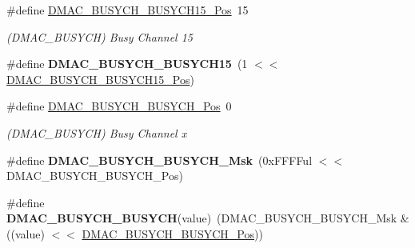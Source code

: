 \begin{DoxyCompactItemize}
\item 
\hypertarget{group___s_a_m_l21___d_m_a_c_ga32266a6c2493fd1bccb96dcc37d50d46}{}\#define \hyperlink{group___s_a_m_l21___d_m_a_c_ga32266a6c2493fd1bccb96dcc37d50d46}{D\+M\+A\+C\+\_\+\+B\+U\+S\+Y\+C\+H\+\_\+\+B\+U\+S\+Y\+C\+H15\+\_\+\+Pos}~15\label{group___s_a_m_l21___d_m_a_c_ga32266a6c2493fd1bccb96dcc37d50d46}

\begin{DoxyCompactList}\small\item\em (D\+M\+A\+C\+\_\+\+B\+U\+S\+Y\+C\+H) Busy Channel 15 \end{DoxyCompactList}\item 
\hypertarget{group___s_a_m_l21___d_m_a_c_ga7c514830398c63aab63c35eb10e139b3}{}\#define {\bfseries D\+M\+A\+C\+\_\+\+B\+U\+S\+Y\+C\+H\+\_\+\+B\+U\+S\+Y\+C\+H15}~(1 $<$$<$ \hyperlink{group___s_a_m_l21___d_m_a_c_ga32266a6c2493fd1bccb96dcc37d50d46}{D\+M\+A\+C\+\_\+\+B\+U\+S\+Y\+C\+H\+\_\+\+B\+U\+S\+Y\+C\+H15\+\_\+\+Pos})\label{group___s_a_m_l21___d_m_a_c_ga7c514830398c63aab63c35eb10e139b3}

\item 
\hypertarget{group___s_a_m_l21___d_m_a_c_gac73b04883faa8828412b8131b075f14a}{}\#define \hyperlink{group___s_a_m_l21___d_m_a_c_gac73b04883faa8828412b8131b075f14a}{D\+M\+A\+C\+\_\+\+B\+U\+S\+Y\+C\+H\+\_\+\+B\+U\+S\+Y\+C\+H\+\_\+\+Pos}~0\label{group___s_a_m_l21___d_m_a_c_gac73b04883faa8828412b8131b075f14a}

\begin{DoxyCompactList}\small\item\em (D\+M\+A\+C\+\_\+\+B\+U\+S\+Y\+C\+H) Busy Channel x \end{DoxyCompactList}\item 
\hypertarget{group___s_a_m_l21___d_m_a_c_ga37928bfcd51c69c992fe835204a67da3}{}\#define {\bfseries D\+M\+A\+C\+\_\+\+B\+U\+S\+Y\+C\+H\+\_\+\+B\+U\+S\+Y\+C\+H\+\_\+\+Msk}~(0x\+F\+F\+F\+Ful $<$$<$ D\+M\+A\+C\+\_\+\+B\+U\+S\+Y\+C\+H\+\_\+\+B\+U\+S\+Y\+C\+H\+\_\+\+Pos)\label{group___s_a_m_l21___d_m_a_c_ga37928bfcd51c69c992fe835204a67da3}

\item 
\hypertarget{group___s_a_m_l21___d_m_a_c_ga1e46692ce8fdde9c3f560965d5c5e815}{}\#define {\bfseries D\+M\+A\+C\+\_\+\+B\+U\+S\+Y\+C\+H\+\_\+\+B\+U\+S\+Y\+C\+H}(value)~(D\+M\+A\+C\+\_\+\+B\+U\+S\+Y\+C\+H\+\_\+\+B\+U\+S\+Y\+C\+H\+\_\+\+Msk \& ((value) $<$$<$ \hyperlink{group___s_a_m_l21___d_m_a_c_gac73b04883faa8828412b8131b075f14a}{D\+M\+A\+C\+\_\+\+B\+U\+S\+Y\+C\+H\+\_\+\+B\+U\+S\+Y\+C\+H\+\_\+\+Pos}))\label{group___s_a_m_l21___d_m_a_c_ga1e46692ce8fdde9c3f560965d5c5e815}


\end{DoxyCompactItemize}
